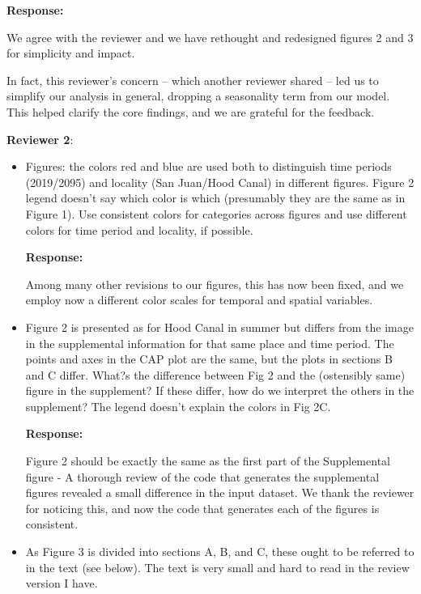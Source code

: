 \documentclass[11pt]{article}
\begin{document}
\begin{linenumbers}
\begin{itemize}
\textbf{Response:}

We agree with the reviewer and we have rethought and redesigned figures 2 and 3 for simplicity and impact. 

In fact, this reviewer's concern -- which another reviewer shared -- led us to simplify our analysis in general, dropping a seasonality term from our model. This helped clarify the core findings, and we are grateful for the feedback. 

\end{itemize}

\vspace*{1em}
\textbf{\large{ Reviewer 2}}: 

\begin{itemize}
\item{Figures: the colors red and blue are used both to distinguish time periods (2019/2095) and locality (San Juan/Hood Canal) in different figures. Figure 2 legend doesn't say which color is which (presumably they are the same as in Figure 1). Use consistent colors for categories across figures and use different colors for time period and locality, if possible.}

\textbf{Response:}

    Among many other revisions to our figures, this has now been fixed, and we employ now a different color scales for temporal and spatial variables.  
    
\item{Figure 2 is presented as for Hood Canal in summer but differs from the image in the supplemental information for that same place and time period. The points and axes in the CAP plot are the same, but the plots in sections B and C differ. What?s the difference between Fig 2 and the (ostensibly same) figure in the supplement? If these differ, how do we interpret the others in the supplement? The legend doesn't explain the colors in Fig 2C.} 

\textbf{Response:}

Figure 2 should be exactly the same as the first part of the Supplemental figure - A thorough review of the code that generates the supplemental figures revealed a small difference in the input dataset. We thank the reviewer for noticing this, and now the code that generates each of the figures is consistent.

\item{As Figure 3 is divided into sections A, B, and C, these ought to be referred to in the text (see below). The text is very small and hard to read in the review version I have.}


\end{itemize}
\end{linenumbers}
\end{document}
